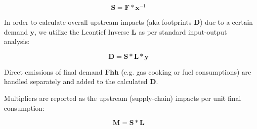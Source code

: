 \begin{equation}
\textbf{S} = \textbf{F} * \textbf{x}^{-1}
\end{equation}

In order to calculate overall upstream impacts (aka footprints $\textbf{D}$) due to a certain demand $\textbf{y}$, we utilize the Leontief Inverse $\textbf{L}$ as per standard input-output analysis:

\begin{equation}
\textbf{D} = \textbf{S} * \textbf{L} * \textbf{y}
\end{equation}

Direct emissions of final demand $\textbf{Fhh}$ (e.g. gas cooking or fuel consumptions) are handled separately and added to the calculated $\textbf{D}$.

Multipliers are reported as the upstream (supply-chain) impacts per unit final consumption:

\begin{equation}
\textbf{M} = \textbf{S} * \textbf{L}
\end{equation}
    
  